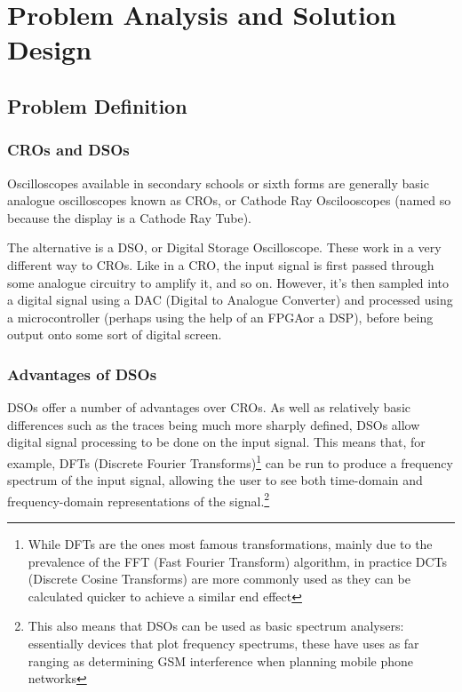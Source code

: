 \chapter{Problem Analysis and Solution Design}
\section{Problem Definition}
\subsection*{CROs and DSOs}

Oscilloscopes available in secondary schools or sixth forms are generally basic
analogue oscilloscopes known as CROs, or Cathode Ray Oscilooscopes (named so
because the display is a Cathode Ray Tube).~\autocite{DoctronicsScopes}

The alternative is a DSO, or Digital Storage Oscilloscope. These work in a very
different way to CROs. Like in a CRO, the input signal is first passed through
some analogue circuitry to amplify it, and so on. However, it's then sampled
into a digital signal using a DAC (Digital to Analogue Converter) and processed
using a microcontroller (perhaps using the help of an FPGA\fdeffpga or a
DSP), before
being output onto some sort of digital screen.~\autocite{TiePieScopes}

\subsection*{Advantages of DSOs}

DSOs offer a number of advantages over CROs. As well as relatively basic
differences such as the traces being much more sharply defined, DSOs allow
digital signal processing to be done on the input signal. This means that, for
example, DFTs (Discrete Fourier Transforms)\footnote{While DFTs are the ones
  most famous transformations, mainly due to the prevalence of the FFT (Fast
  Fourier Transform) algorithm, in practice DCTs (Discrete Cosine Transforms)
  are more commonly used as they can be calculated quicker to achieve a similar
end effect} can be run to produce a frequency spectrum of the input signal,
allowing the user to see both time-domain and frequency-domain representations
of the signal.\footnote{This also means that DSOs can be used as basic spectrum
analysers: essentially devices that plot frequency spectrums, these have uses as
far ranging as determining GSM interference when planning mobile phone networks}


